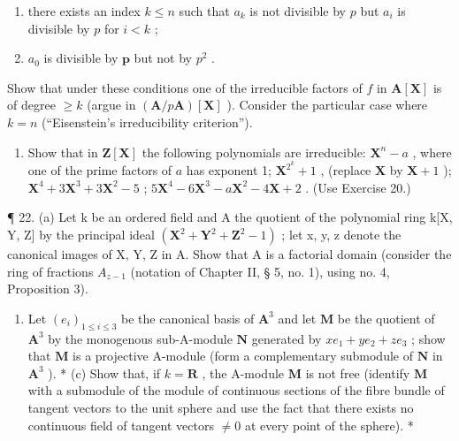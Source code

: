 \begin{enumerate}
\def\labelenumi{(\arabic{enumi})}
\item
  there exists an index \(k \leqslant n\) such that \(a_{k}\) is not divisible by \(p\) but \(a_{i}\) is divisible by \(p\) for \(i < k\) ;
\item
  \(a_0\) is divisible by \(\pmb{p}\) but not by \(p^2\) .
\end{enumerate}

Show that under these conditions one of the irreducible factors of \(f\) in \(\mathbf{A}[\mathbf{X}]\) is of degree \(\geqslant k\) (argue in \((\mathbf{A} / p\mathbf{A})[\mathbf{X}]\) ). Consider the particular case where \(k = n\) (``Eisenstein's irreducibility criterion'').

\begin{enumerate}
\def\labelenumi{\arabic{enumi}.}
\setcounter{enumi}{20}
\tightlist
\item
  Show that in \(\mathbf{Z}[\mathbf{X}]\) the following polynomials are irreducible: \(\mathbf{X}^n - a\) , where one of the prime factors of \(a\) has exponent 1; \(\mathbf{X}^{2^k} + 1\) , (replace \(\mathbf{X}\) by \(\mathbf{X} + 1\) ); \(\mathbf{X}^4 + 3\mathbf{X}^3 + 3\mathbf{X}^2 - 5\) ; \(5\mathbf{X}^4 - 6\mathbf{X}^3 - a\mathbf{X}^2 - 4\mathbf{X} + 2\) . (Use Exercise 20.)
\end{enumerate}

¶ 22. (a) Let k be an ordered field and A the quotient of the polynomial ring k{[}X, Y, Z{]} by the principal ideal \((\mathbf{X}^{2} + \mathbf{Y}^{2} + \mathbf{Z}^{2} - 1)\) ; let x, y, z denote the canonical images of X, Y, Z in A. Show that A is a factorial domain (consider the ring of fractions \(A_{z-1}\) (notation of Chapter II, § 5, no. 1), using no. 4, Proposition 3).

\begin{enumerate}
\def\labelenumi{(\alph{enumi})}
\setcounter{enumi}{1}
\tightlist
\item
  Let \((e_i)_{1 \leq i \leq 3}\) be the canonical basis of \(\mathbf{A}^3\) and let \(\mathbf{M}\) be the quotient of \(\mathbf{A}^3\) by the monogenous sub-A-module \(\mathbf{N}\) generated by \(xe_1 + ye_2 + ze_3\) ; show that \(\mathbf{M}\) is a projective A-module (form a complementary submodule of \(\mathbf{N}\) in \(\mathbf{A}^3\) ). * (c) Show that, if \(k = \mathbf{R}\) , the A-module \(\mathbf{M}\) is not free (identify \(\mathbf{M}\) with a submodule of the module of continuous sections of the fibre bundle of tangent vectors to the unit sphere and use the fact that there exists no continuous field of tangent vectors \(\neq 0\) at every point of the sphere). *
\end{enumerate}

